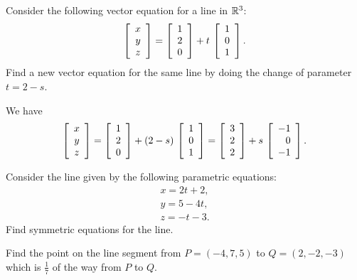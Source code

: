 \documentclass{ximera}
\begin{document}
\begin{exercise}
  Consider the following vector equation for a line in $\R^3$:
  \begin{equation*}
    \startmat{c} x\\y\\z \stopmat
    = \startmat{r} 1\\2\\0 \stopmat
    + t\,\startmat{r} 1\\0\\1 \stopmat.
  \end{equation*}
  Find a new vector equation for the same line by doing the change of
  parameter $t=2-s$.
  \begin{solution}
    We have
    \begin{equation*}
      \startmat{c} x\\y\\z \stopmat
      = \startmat{r} 1\\2\\0 \stopmat
      + (2-s)\,\startmat{c} 1\\0\\1 \stopmat
      = \startmat{r} 3\\2\\2 \stopmat
      + s\,\startmat{r} -1\\0\\-1 \stopmat.
    \end{equation*}
  \end{solution}
\end{exercise}

\begin{exercise}
  Consider the line given by the following parametric equations:
  \begin{equation*}
    \begin{array}{c}
      x = 2t+2, \\
      y = 5-4t, \\
      z= -t-3.
    \end{array}
  \end{equation*}
  Find symmetric equations for the line.
\end{exercise}

\begin{exercise}
  Find the point on the line segment from $P = (-4, 7, 5)$ to
  $Q = (2, -2, -3)$ which is $\frac{1}{7}$ of the way from $P$
  to $Q$.
\end{exercise}
\end{document}
